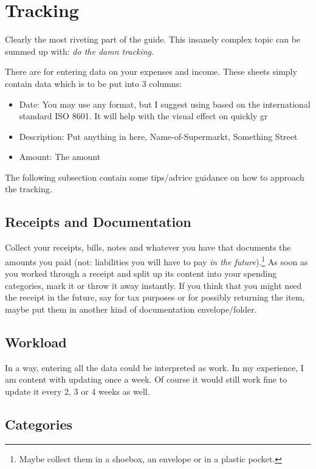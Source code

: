 \section{Tracking}
\label{sec:Tracking}

Clearly the most riveting part of the guide.
This insanely complex topic can be summed up with: \emph{do the damn tracking}.

There are  for entering data on your expenses and income.
These sheets simply contain data which is to be put into 3 columns:
\begin{itemize}
	\item Date: You may use any format, but I suggest using  based on the international standard ISO 8601.
	It will help with the visual effect on quickly gr
	\item Description: Put anything in here, \eg Name-of-Supermarkt, Something Street
	\item Amount: The amount
\end{itemize}

The following subsection contain some tips/advice guidance on how to approach the tracking. 

\subsection{Receipts and Documentation}
\label{subsec:receipts}

Collect your receipts, bills, notes and whatever you have that documents the amounts you paid (not: liabilities you will have to pay \emph{in the future}).\footnote{Maybe collect them in a shoebox, an envelope or in a plastic pocket.}
As soon as you worked through a receipt and split up its content into your spending categories, mark it or throw it away instantly.
If you think that you might need the receipt in the future, say for tax purposes or for possibly returning the item, maybe put them in another kind of documentation envelope/folder.

\subsection{Workload}
\label{subsec:workload}

In a way, entering all the data could be interpreted as work.
In my experience, I am content with updating \tfn once a week.
Of course it would still work fine to update it every 2, 3 or 4 weeks as well.

\subsection{Categories}
\label{subsec:tracking-categories}

